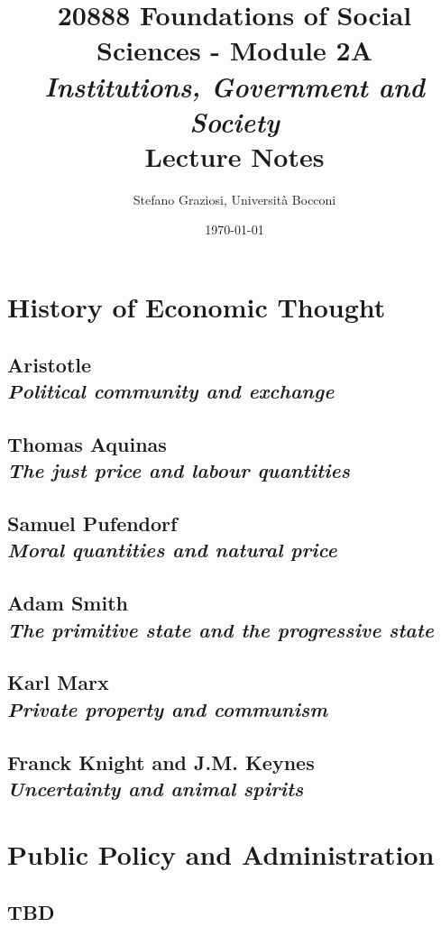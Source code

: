 \documentclass[dvipsnames,12pt]{book}
\title{20888 Foundations of Social Sciences - Module 2A \\[0.2cm] {\Large \textit{Institutions, Government and Society}} \\[1cm] \textbf{Lecture Notes}}
\author{Stefano Graziosi, Università Bocconi}
\date{\today}
\begin{document}
\maketitle

\tableofcontents

\part{History of Economic Thought}

    \chapter[Political community and exchange]{Aristotle \\[0.6cm] \textit{Political community and exchange}}

    \chapter[The just price and labour quantities]{Thomas Aquinas \\[0.6cm] \textit{The just price and labour quantities}}

    \chapter[Moral quantities and natural price]{Samuel Pufendorf \\[0.6cm] \textit{Moral quantities and natural price}}

    \chapter[The primitive state and the progressive state]{Adam Smith \\[0.6cm] \textit{The primitive state and the progressive state}}

    \chapter[Private property and communism]{Karl Marx \\[0.6cm] \textit{Private property and communism}}

    \chapter[Uncertainty and animal spirits]{Franck Knight and J.M. Keynes \\[0.6cm] \textit{Uncertainty and animal spirits}}

\part{Public Policy and Administration}

    \chapter{TBD}
\end{document}
